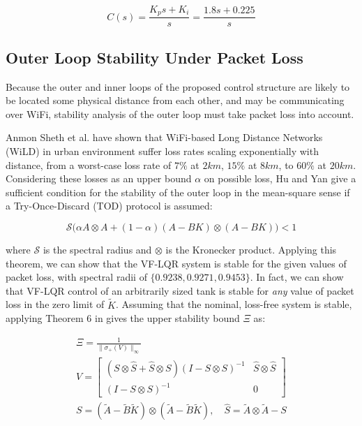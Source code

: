 \begin{equation}\label{eq:PIDTransferFunction}
	C(s) = \frac{K_ps+K_i}{s} = \frac{1.8s+0.225}{s}
\end{equation}

\subsection{Outer Loop Stability Under Packet Loss}\label{subsec:PacketLossStability}

Because the outer and inner loops of the proposed control structure are likely to be located some physical distance from each other, and may be communicating over WiFi, stability analysis of the outer loop must take packet loss into account.

Anmon Sheth et al. \cite{Sheth2007} have shown that WiFi-based Long Distance Networks (WiLD) in urban environment suffer loss rates scaling exponentially with distance, from a worst-case loss rate of $7\%$ at $2\si{km}$, $15\%$ at $8\si{km}$, to $60\%$ at $20\si{km}$. Considering these losses as an upper bound $\alpha$ on possible loss, Hu and Yan \cite{Hu2007} give a sufficient condition for the stability of the outer loop in the mean-square sense if a Try-Once-Discard (TOD) protocol is assumed:

\begin{equation}\label{eq:HuStabCondition}
	\mathcal{S}\Big(\alpha A \otimes A + (1-\alpha)(A-BK) \otimes (A-BK) \Big) < 1
\end{equation}

where $\mathcal{S}$ is the spectral radius and $\otimes$ is the Kronecker product. Applying this theorem, we can show that the VF-LQR system is stable for the given values of packet loss, with spectral radii of $\{0.9238,0.9271,0.9453\}$. In fact, we can show that VF-LQR control of an arbitrarily sized tank is stable for \textit{any} value of packet loss in the zero limit of $\tilde{K}$. Assuming that the nominal, loss-free system is stable, applying Theorem 6 in \cite{Hu2007} gives the upper stability bound $\Xi$ as: 

\begin{equation}\label{eq:VMatrix}
	\begin{gathered}
		\Xi = \frac{1}{\lVert\sigma_+(V)\rVert_\infty} \\
		V = \begin{bmatrix} (S\otimes\hat{S}+\hat{S} \otimes S)(I - S\otimes S)^{-1} & \hat{S}\otimes\hat{S} \\ (I - S\otimes S)^{-1} & 0 \end{bmatrix} \\
		S = \left(\tilde{A}-\tilde{B}\tilde{K}\right) \otimes \left(\tilde{A}-\tilde{B}\tilde{K}\right), \quad \hat{S} = \tilde{A} \otimes \tilde{A} - S
	\end{gathered}
\end{equation}

